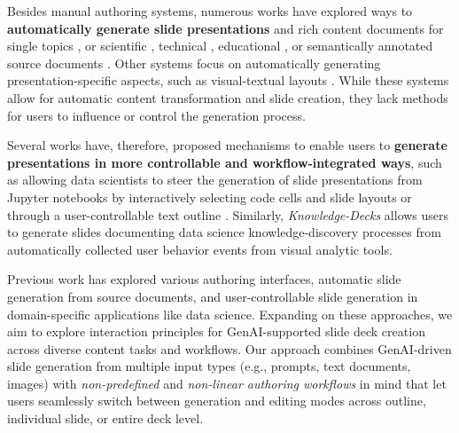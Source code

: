 Besides manual authoring systems, numerous works have explored ways to \textbf{automatically generate slide presentations} and rich content documents for single topics \cite{winters_automatically_2019a}, or scientific \cite{Fu2022DOC2PPT}, technical \cite{M2009SlidesGen}, educational \cite{costa_smartedu_2023}, or semantically annotated source documents \cite{masao_automatic_1999}. Other systems focus on automatically generating presentation-specific aspects, such as visual-textual layouts \cite{yang_automatic_2016}.
While these systems allow for automatic content transformation and slide creation, they lack methods for users to influence or control the generation process.  

Several works have, therefore, proposed mechanisms to enable users to \textbf{generate presentations in more controllable and workflow-integrated ways}, such as allowing data scientists to steer the generation of slide presentations from Jupyter notebooks by interactively selecting code cells and slide layouts \cite{wang_slide4n_2023} or through a user-controllable text outline \cite{wang_outlinespark_2024}. 
Similarly, \textit{Knowledge-Decks} \cite{christino_knowledgedecks_2022} allows users to generate slides documenting data science knowledge-discovery processes from automatically collected user behavior events from visual analytic tools. 


Previous work has explored various authoring interfaces, automatic slide generation from source documents, and user-controllable slide generation in domain-specific applications like data science. Expanding on these approaches, we aim to explore interaction principles for GenAI-supported slide deck creation across diverse content tasks and workflows. Our approach combines GenAI-driven slide generation from multiple input types (e.g., prompts, text documents, images) with \textit{non-predefined} and \textit{non-linear authoring workflows} in mind that let users seamlessly switch between generation and editing modes across outline, individual slide, or entire deck level.
















